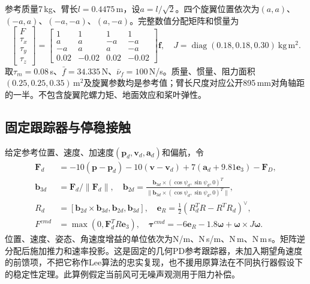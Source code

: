 参考质量7\,kg、臂长$l=0.4475$\,m，设$a=l/\sqrt2$。四个旋翼位置依次为$(a,a)$、$(-a,a)$、$(-a,-a)$、$(a,-a)$。完整数值分配矩阵和惯量为
\begin{equation}
 \begin{bmatrix}F\\\tau_x\\\tau_y\\\tau_z\end{bmatrix}
 =\begin{bmatrix}1&1&1&1\\a&a&-a&-a\\-a&a&a&-a\\0.02&-0.02&0.02&-0.02\end{bmatrix}\mathbf f,
 \quad J=\operatorname{diag}(0.18,0.18,0.30)\ \mathrm{kg\,m^2}.
 \label{s0404:numeric_allocation}
\end{equation}
取$\tau_m=0.08$\,s、$\bar f=34.335$\,N、$\bar\nu_f=100$\,N/s。质量、惯量、阻力面积$(0.25,0.25,0.35)$\,$\mathrm m^2$及旋翼参数均是参考值；臂长尺度对应公开895\,mm对角轴距的一半\cite{DJIM300Manual}。不包含旋翼陀螺力矩、地面效应和桨叶弹性。

\subsection{固定跟踪器与停稳接触}

给定参考位置、速度、加速度$(\mathbf p_d,\mathbf v_d,\mathbf a_d)$和偏航，令
\begin{align}
 \mathbf F_d&=-10(\mathbf p-\mathbf p_d)-10(\mathbf v-\mathbf v_d)
              +7(\mathbf a_d+9.81\mathbf e_3)-\mathbf F_D,\\
 \mathbf b_{3d}&=\mathbf F_d/\|\mathbf F_d\|,\quad
 \mathbf b_{2d}=\frac{\mathbf b_{3d}\times(\cos\psi_d,\sin\psi_d,0)^T}
 {\|\mathbf b_{3d}\times(\cos\psi_d,\sin\psi_d,0)^T\|},\\
 R_d&=[\mathbf b_{2d}\times\mathbf b_{3d},\mathbf b_{2d},\mathbf b_{3d}],\quad
 \mathbf e_R=\tfrac12(R_d^TR-R^TR_d)^\vee,\\
 F^{cmd}&=\max(0,\mathbf F_d^TR\mathbf e_3),\quad
 \boldsymbol\tau^{cmd}=-6\mathbf e_R-1.8\boldsymbol\omega+\boldsymbol\omega\times J\boldsymbol\omega.
 \label{s0404:numeric_feedback}
\end{align}
位置、速度、姿态、角速度增益的单位依次为N/m、N\,s/m、N\,m、N\,m\,s。矩阵逆分配后施加推力和速率投影。这是固定的几何PD参考跟踪器，未加入期望角速度的前馈项，不把它称作Lee算法的忠实复现，也不援用原算法在不同执行器假设下的稳定性定理。此算例假定当前风可无噪声观测用于阻力补偿。

